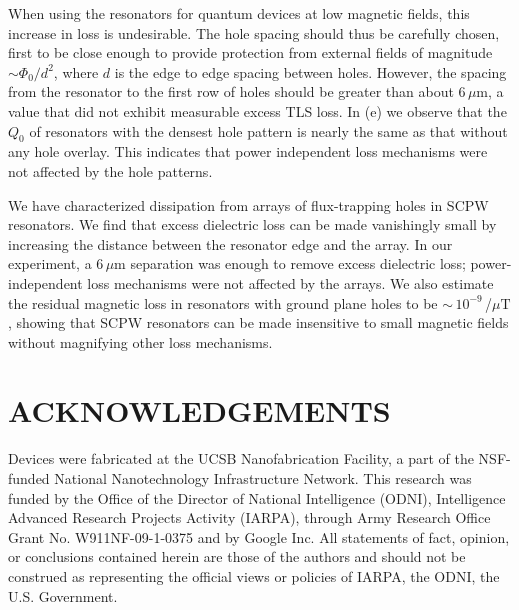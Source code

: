 When using the resonators for quantum devices at low magnetic fields, this increase in loss is undesirable.  The hole spacing should thus be carefully chosen, first to be close enough to provide protection from external fields of magnitude $\sim \Phi_0/d^2$, where $d$ is the edge to edge spacing between holes\cite{stan2004}.  However, the spacing from the resonator to the first row of holes should be greater than about $6\,\mu\textrm{m}$, a value that did not exhibit measurable excess TLS loss.  In (e) we observe that the $Q_0$ of resonators with the densest hole pattern is nearly the same as that without any hole overlay.  This indicates that power independent loss mechanisms were not affected by the hole patterns.

We have characterized dissipation from arrays of flux-trapping holes in SCPW resonators.  We find that excess dielectric loss can be made vanishingly small by increasing the distance between the resonator edge and the array.  In our experiment, a 6\,$\mu \text{m}$ separation was enough to remove excess dielectric loss; power-independent loss mechanisms were not affected by the arrays.  We also estimate the residual magnetic loss in resonators with ground plane holes to be $\sim$\,$10^{-9}$\,/$\mu\text{T}$, showing that SCPW resonators can be made insensitive to small magnetic fields without magnifying other loss mechanisms.

\section*{ACKNOWLEDGEMENTS}%
Devices were fabricated at the UCSB Nanofabrication Facility, a part of the NSF-funded National Nanotechnology Infrastructure Network.  This research was funded by the Office of the Director of National Intelligence (ODNI), Intelligence Advanced Research Projects Activity (IARPA), through Army Research Office Grant No. W911NF-09-1-0375 and by Google Inc. All statements of fact, opinion, or conclusions contained herein are those of the authors and should not be construed as representing the official views or policies of IARPA, the ODNI, the U.S. Government.

\clearpage
\newcommand{\beginsupplement}{%
        \setcounter{table}{0}
        \renewcommand{\thetable}{S\arabic{table}}%
        \setcounter{figure}{0}
        \renewcommand{\thefigure}{S\arabic{figure}}%
        \setcounter{equation}{0}
        \renewcommand{\theequation}{S\arabic{equation}}%
     }
\beginsupplement
\makeatletter
\makeatother

